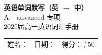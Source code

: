 \documentclass[10pt,a4paper]{article}
\begin{document}
\pagestyle{plain}

\begin{center}
{\LARGE\bfseries 英语单词默写（英 $\to$ 中）}\\[0.3em]
{\large A -- advanced \quad 专项}\\[0.25em]
{\small 2029届高一英语词汇手册}
\end{center}

\vspace{0.5em}
\noindent\begin{tabular}{@{}p{}@{}p{}@{}p{}@{}}
姓名：\underline{\hspace{2.0cm}} & 日期：\underline{\hspace{2.0cm}} & 得分：\underline{\hspace{1.3cm}}\,/\,50 \\
\end{tabular}

\vspace{0.4em}

\vspace{0.15em}
\end{document}
